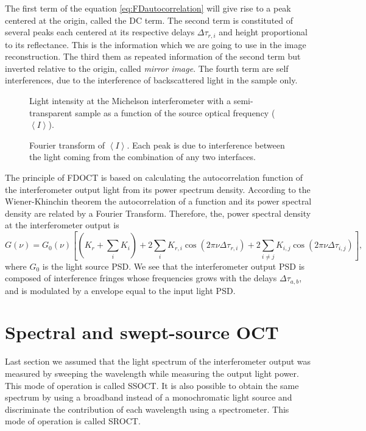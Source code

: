 \documentclass[12pt,twoside,english]{book}
\renewcommand{\~}{\perispomeni}%
\numberwithin{equation}{section}
\numberwithin{figure}{section}
\begin{document}
The first term of the equation \ref{eq:FDautocorrelation} will give rise to a peak centered at the origin, called the DC term. The second term is constituted of several peaks each centered at its respective delays $\Delta\tau_{r,i}$ and height proportional to its reflectance. This is the information which we are going to use in the image reconstruction.
The third them as repeated information of the second term but inverted relative to the origin, called \emph{mirror image}. The fourth term are self interferences, due to the interference of backscattered light in the sample only.

%
\begin{figure}[h]
%
\begin{minipage}[t]{0.48\columnwidth}%
\caption{Light intensity at the Michelson interferometer with a semi-transparent sample as a function of the source optical frequency ($\left<I\right>$). \label{fig:graphics interference bi-layer}}
%
\end{minipage}\hfill{}%
\begin{minipage}[t]{0.48\columnwidth}%
\caption{Fourier transform of $\left<I\right>$. Each peak is due to interference between the light coming from the combination of any two interfaces. \label{fig:ft graph interferometer bi-layer}}
%
\end{minipage}
\end{figure}

The principle of \gls{FDOCT} is based on calculating the autocorrelation function of the interferometer output light from its power spectrum density. According to the Wiener-Khinchin theorem the autocorrelation of a function and its power spectral density are related by a Fourier Transform. Therefore, the, power spectral density at the interferometer output is
\begin{equation}
G\left(\nu\right)=G_{0}\left(\nu\right)\left[\left(K_{r}+\sum_{i}K_{i}\right)+2\sum_{i}K_{r,i}\cos\left(2\pi\nu\Delta\tau_{r,i}\right)+2\sum_{i\ne j}K_{i,j}\cos\left(2\pi\nu\Delta\tau_{i,j}\right)\right],
\label{eq:FDOCT output spectrum}
\end{equation}
where $G_{0}$ is the light source \gls{PSD}. We see that the interferometer output \gls{PSD} is composed of interference fringes whose frequencies grows with the delays $\Delta\tau_{a,b}$, and is modulated by a envelope equal to the input light \gls{PSD}.
\section{Spectral and swept-source OCT}
Last section we assumed that the light spectrum of the interferometer output was measured by sweeping the wavelength while measuring the output light power. This mode of operation is called \gls{SSOCT}. It is also possible to obtain the same spectrum by using a broadband instead of a monochromatic light source and discriminate the contribution of each wavelength using a spectrometer. This mode of operation is called \gls{SROCT}.
\end{document}
